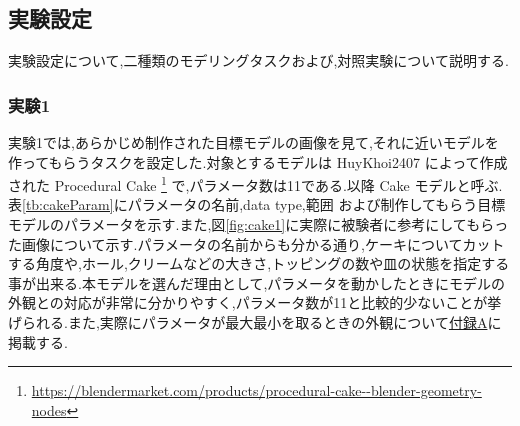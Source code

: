 \subsection{実験設定}
実験設定について,二種類のモデリングタスクおよび,対照実験について説明する.

\subsubsection{実験1}
実験1では,あらかじめ制作された目標モデルの画像を見て,それに近いモデルを作ってもらうタスクを設定した.対象とするモデルは HuyKhoi2407 によって作成された Procedural Cake \footnote[4]{\url{https://blendermarket.com/products/procedural-cake--blender-geometry-nodes} } で,パラメータ数は11である.以降 Cake モデルと呼ぶ.表\ref{tb:cakeParam}にパラメータの名前,data type,範囲 および制作してもらう目標モデルのパラメータを示す.また,図\ref{fig:cake1}に実際に被験者に参考にしてもらった画像について示す.パラメータの名前からも分かる通り,ケーキについてカットする角度や,ホール,クリームなどの大きさ,トッピングの数や皿の状態を指定する事が出来る.本モデルを選んだ理由として,パラメータを動かしたときにモデルの外観との対応が非常に分かりやすく,パラメータ数が11と比較的少ないことが挙げられる.また,実際にパラメータが最大最小を取るときの外観について\hyperref[paramMean]{付録A}に掲載する.

\begin{table}[h]
	\centering
	\caption{Cake モデルのパラメータ\label{tb:cakeParam}}
\end{table}


